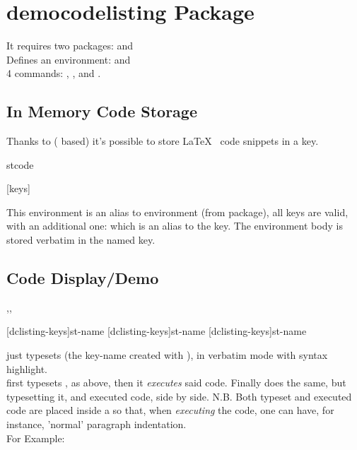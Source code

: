 \documentclass[dctools,english]{ufrgscca}
\begin{document}
\section{democodelisting Package}

It requires two packages:  and \\
Defines an environment:  and\\
 4 commands: \Macro{\DemoCode}{}, \Macro{\DisplayCode}{},  \Macro{\TabbedDisplayCode}{} and \Macro{\setdclisting}{}.

\subsection{In Memory Code Storage}
Thanks to  ( based) it's possible to store \LaTeX~ code snippets in a  key.

\begin{Envs}{stcode}
	\begin{Syntax}%
		\Macro{\begin{stcode}}[keys]{} \Macro{\end{stcode}}{}
	\end{Syntax}
This environment is an alias to  environment (from  package), all  keys are valid, with an additional one:  which is an alias to the  key.
The environment body is stored verbatim in the  named key.
\end{Envs}

\subsection{Code Display/Demo}
\begin{Macros}{\DisplayCode,\DemoCode,\TabbedDemoCode}
	\begin{Syntax}%
		\Macro{\DisplayCode}[dclisting-keys]{st-name}
		\Macro{\DemoCode}[dclisting-keys]{st-name}
		\Macro{\TabbedDemoCode}[dclisting-keys]{st-name}
	\end{Syntax}
\end{Macros}
\Macro{\DisplayCode}{} just typesets  (the key-name created with ), in verbatim mode with syntax highlight.\\
\Macro{\DemoCode}{} first typesets , as above, then it \emph{executes} said code.
Finally \Macro{\TabbedDemoCode}{} does the same, but typesetting it, and executed code, side by side. N.B. Both typeset  and executed code are placed inside a  so that, when \emph{executing} the code, one can have, for instance, 'normal' paragraph indentation.\\
For Example:
\end{document}
